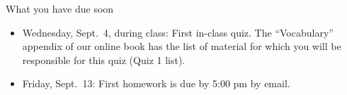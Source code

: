\documentclass[
  10pt,
  ignorenonframetext,
]{beamer}
\providecommand{\tightlist}{%
  \setlength{\itemsep}{0pt}\setlength{\parskip}{0pt}}
\begin{document}
\begin{frame}{What you have due soon}
\protect\hypertarget{what-you-have-due-soon}{}

\begin{itemize}
\tightlist
\item
  Wednesday, Sept.~4, during class: First in-class quiz. The
  ``Vocabulary'' appendix of our online book has the list of material
  for which you will be responsible for this quiz (Quiz 1 list).
\item
  Friday, Sept.~13: First homework is due by 5:00 pm by email.
\end{itemize}

\end{frame}
\end{document}
